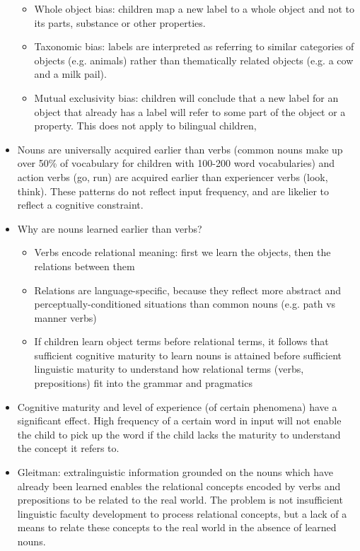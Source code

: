 \documentclass{article}
\begin{document}
\begin{itemize}
\begin{itemize}
        \item Whole object bias: children map a new label to a whole object and not to its parts, substance or other properties.
        \item Taxonomic bias: labels are interpreted as referring to similar categories of objects (e.g. animals) rather than thematically related objects (e.g. a cow and a milk pail).
        \item Mutual exclusivity bias: children will conclude that a new label for an object that already has a label will refer to some part of the object or a property. This does not apply to bilingual children,
    \end{itemize}
    \item Nouns are universally acquired earlier than verbs (common nouns make up over 50\% of vocabulary for children with 100-200 word vocabularies) and action verbs (go, run) are acquired earlier than experiencer verbs (look, think). These patterns do not reflect input frequency, and are likelier to reflect a cognitive constraint.
    \item Why are nouns learned earlier than verbs?
    \begin{itemize}
        \item Verbs encode relational meaning: first we learn the objects, then the relations between them
        \item Relations are language-specific, because they reflect more abstract and perceptually-conditioned situations than common nouns (e.g. path vs manner verbs)
        \item If children learn object terms before relational terms, it follows that sufficient cognitive maturity to learn nouns is attained before sufficient linguistic maturity to understand how relational terms (verbs, prepositions) fit into the grammar and pragmatics
    \end{itemize}
    \item Cognitive maturity and level of experience (of certain phenomena) have a significant effect. High frequency of a certain word in input will not enable the child to pick up the word if the child lacks the maturity to understand the concept it refers to.
    \item Gleitman: extralinguistic information grounded on the nouns which have already been learned enables the relational concepts encoded by verbs and prepositions to be related to the real world. The problem is not insufficient linguistic faculty development to process relational concepts, but a lack of a means to relate these concepts to the real world in the absence of learned nouns.

\end{itemize}
\end{document}
